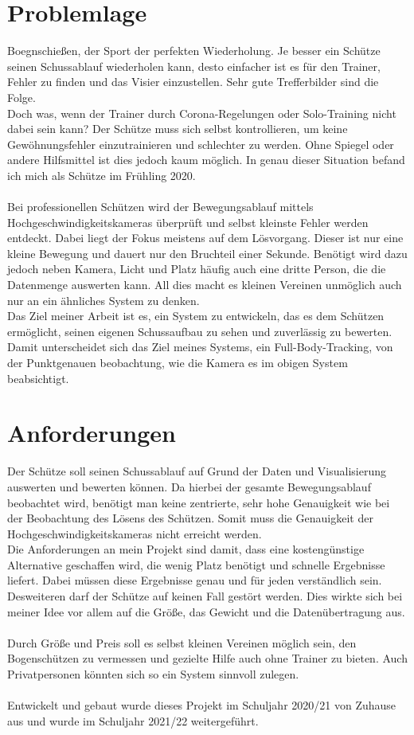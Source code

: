 \section{Problemlage}
Boegnschießen, der Sport der perfekten Wiederholung. Je besser ein Schütze seinen Schussablauf wiederholen kann, 
desto einfacher ist es für den Trainer, Fehler zu finden und das Visier einzustellen. Sehr gute Trefferbilder sind 
die Folge.\\
Doch was, wenn der Trainer durch Corona-Regelungen oder Solo-Training nicht dabei sein kann? Der Schütze muss sich
selbst kontrollieren, um keine Gewöhnungsfehler einzutrainieren und schlechter zu werden. Ohne Spiegel oder andere 
Hilfsmittel ist dies jedoch kaum möglich. In genau dieser Situation befand ich mich als Schütze im Frühling 2020.\\ 
\\
Bei professionellen Schützen wird der Bewegungsablauf mittels Hochgeschwindigkeitskameras überprüft und selbst kleinste
Fehler werden entdeckt. Dabei liegt der Fokus meistens auf dem Lösvorgang. Dieser ist nur eine kleine Bewegung und 
dauert nur den Bruchteil einer Sekunde.
Benötigt wird dazu jedoch neben Kamera, Licht und Platz häufig auch eine dritte Person, die die
Datenmenge auswerten kann. All dies macht es kleinen Vereinen unmöglich auch nur an ein ähnliches System zu denken.\\
Das Ziel meiner Arbeit ist es, ein System zu entwickeln, das es dem Schützen ermöglicht, seinen eigenen Schussaufbau 
zu sehen und zuverlässig zu bewerten. Damit unterscheidet sich das Ziel meines Systems, ein Full-Body-Tracking, von der
Punktgenauen beobachtung, wie die Kamera es im obigen System beabsichtigt.

\section{Anforderungen}
Der Schütze soll seinen Schussablauf auf Grund der Daten und Visualisierung auswerten und bewerten können.
Da hierbei der gesamte Bewegungsablauf beobachtet wird, benötigt man keine zentrierte, sehr hohe Genauigkeit wie bei der 
Beobachtung des Lösens des Schützen. Somit muss die Genauigkeit der Hochgeschwindigkeitskameras nicht erreicht werden.
\\
Die Anforderungen an mein Projekt sind damit, dass eine kostengünstige Alternative 
geschaffen wird, die wenig Platz benötigt und schnelle Ergebnisse liefert. Dabei müssen diese 
Ergebnisse genau und für jeden verständlich sein.\\
Desweiteren darf der Schütze auf keinen Fall gestört werden.
Dies wirkte sich bei meiner Idee vor allem auf die Größe, das Gewicht und die 
Datenübertragung aus.\\
\\
Durch Größe und Preis soll es selbst kleinen Vereinen möglich sein, den Bogenschützen zu vermessen und gezielte Hilfe
auch ohne Trainer zu bieten. Auch Privatpersonen könnten sich so ein System sinnvoll zulegen.\\
\\
Entwickelt und gebaut wurde dieses Projekt im Schuljahr 2020/21 von Zuhause aus und wurde 
im Schuljahr 2021/22 weitergeführt.

